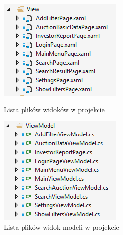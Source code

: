 \documentclass[a4paper,twoside,titlepage,openright]{book}
\begin{document}
\begin{figure}[htp]
	\centering
	\begin{minipage}[b]{0.3\textwidth}
		\includegraphics[width=\textwidth]{listawidokow.png}
		\caption{Lista plików widoków w projekcie}
	\end{minipage}
\hspace*{60px}
	\begin{minipage}[b]{0.3\textwidth}
		\includegraphics[width=\textwidth]{listaviewmodeli.png}
		\caption{Lista plików widok-modeli w projekcie}
	\end{minipage}
	\hfill
\end{figure}
\end{document}
